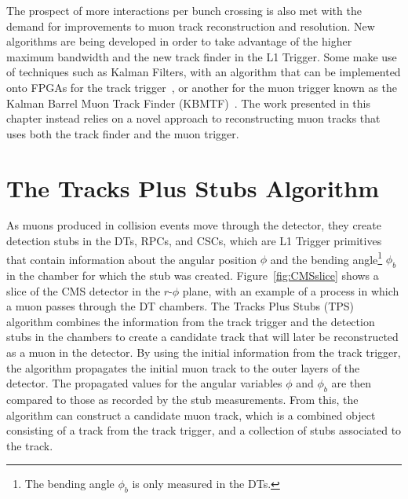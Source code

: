 The prospect of more interactions per bunch crossing is also met with the demand for improvements to muon track reconstruction and resolution.
New algorithms are being developed in order to take advantage of the higher maximum bandwidth and the new track finder in the L1 Trigger.
Some make use of techniques such as Kalman Filters, with an algorithm that can be implemented onto FPGAs for the track trigger~\cite{Amstutz:2194514}, or another for the muon trigger known as the Kalman Barrel Muon Track Finder (KBMTF)~\cite{Bachtis:2648953}.
The work presented in this chapter instead relies on a novel approach to reconstructing muon tracks that uses both the track finder and the muon trigger.

\section{The Tracks Plus Stubs Algorithm}
\label{sec:TPS}

As muons produced in collision events move through the detector, they create detection stubs in the DTs, RPCs, and CSCs, which are L1 Trigger primitives that contain information about the angular position $\phi$ and the bending angle\footnote{The bending angle $\phi_b$ is only measured in the DTs.} $\phi_b$ in the chamber for which the stub was created.
Figure~\ref{fig:CMSslice} shows a slice of the CMS detector in the $r$-$\phi$ plane, with an example of a process in which a muon passes through the DT chambers.
The Tracks Plus Stubs (TPS) algorithm combines the information from the track trigger and the detection stubs in the chambers to create a candidate track that will later be reconstructed as a muon in the detector.
By using the initial information from the track trigger, the algorithm propagates the initial muon track to the outer layers of the detector.
The propagated values for the angular variables $\phi$ and $\phi_b$ are then compared to those as recorded by the stub measurements.
From this, the algorithm can construct a candidate muon track, which is a combined object consisting of a track from the track trigger, and a collection of stubs associated to the track.

